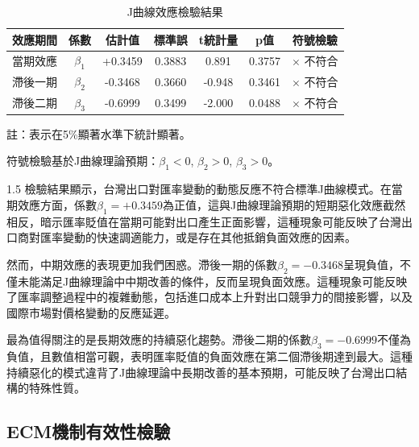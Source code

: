 \documentclass[a4paper,12pt]{article}
\begin{document}
\begin{table}[h]
  \centering
  \begin{threeparttable}
    \caption{J曲線效應檢驗結果}
    \label{tab:j_curve_results}
    \begin{tabular}{lcccccc}
      \toprule
      效應期間 & 係數 & 估計值 & 標準誤 & t統計量 & p值 & 符號檢驗 \\
      \midrule
      當期效應 & $\beta_1$ & +0.3459          & 0.3883 & 0.891  & 0.3757 & $\times$ 不符合 \\
      滯後一期 & $\beta_2$ & -0.3468          & 0.3660 & -0.948 & 0.3461 & $\times$ 不符合 \\
      滯後二期 & $\beta_3$ & -0.6999\tnote{*} & 0.3499 & -2.000 & 0.0488 & $\times$ 不符合 \\
      \bottomrule
    \end{tabular}

    \begin{tablenotes}
      \footnotesize
      \item 註：\tnote{*}表示在5\%顯著水準下統計顯著。
      \item 符號檢驗基於J曲線理論預期：$\beta_1 < 0$, $\beta_2 > 0$, $\beta_3 > 0$。
    \end{tablenotes}
  \end{threeparttable}
\end{table}
\begin{spacing}{1.5}
檢驗結果顯示，台灣出口對匯率變動的動態反應不符合標準J曲線模式。在當期效應方面，係數$\beta_1 = +0.3459$為正值，這與J曲線理論預期的短期惡化效應截然相反，暗示匯率貶值在當期可能對出口產生正面影響，這種現象可能反映了台灣出口商對匯率變動的快速調適能力，或是存在其他抵銷負面效應的因素。

然而，中期效應的表現更加我們困惑。滯後一期的係數$\beta_2 = -0.3468$呈現負值，不僅未能滿足J曲線理論中中期改善的條件，反而呈現負面效應。這種現象可能反映了匯率調整過程中的複雜動態，包括進口成本上升對出口競爭力的間接影響，以及國際市場對價格變動的反應延遲。

最為值得關注的是長期效應的持續惡化趨勢。滯後二期的係數$\beta_3 = -0.6999$不僅為負值，且數值相當可觀，表明匯率貶值的負面效應在第二個滯後期達到最大。這種持續惡化的模式違背了J曲線理論中長期改善的基本預期，可能反映了台灣出口結構的特殊性質。
\end{spacing}

\vspace{-0.5cm}

\subsection{ECM機制有效性檢驗}
\end{document}

